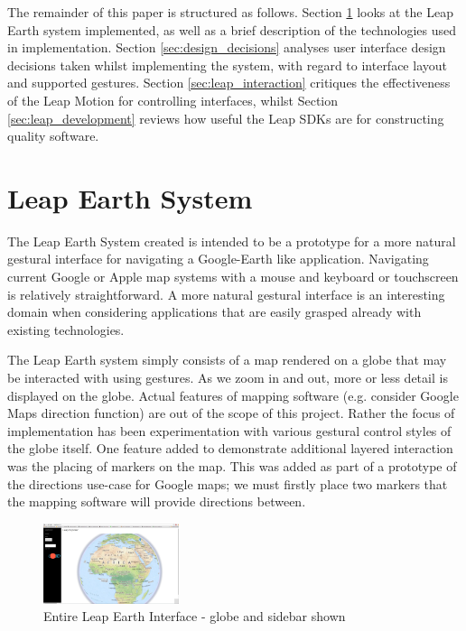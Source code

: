 \documentclass{sigplanconf}
\begin{document}
The remainder of this paper is structured as follows. Section \ref{sec:leap_system} looks at the Leap Earth system implemented, as well as a brief description of the technologies used in implementation. Section \ref{sec:design_decisions} analyses user interface design decisions taken whilst implementing the system, with regard to interface layout and supported gestures. Section \ref{sec:leap_interaction} critiques the effectiveness of the Leap Motion for controlling interfaces, whilst Section \ref{sec:leap_development} reviews how useful the Leap SDKs are for constructing quality software.

\section{Leap Earth System}
\label{sec:leap_system}

The Leap Earth System created is intended to be a prototype for a more natural gestural interface for navigating a Google-Earth like application. Navigating current Google or Apple map systems with a mouse and keyboard or touchscreen is relatively straightforward. A more natural gestural interface is an interesting domain when considering applications that are easily grasped already with existing technologies. 

The Leap Earth system simply consists of a map rendered on a globe that may be interacted with using gestures. As we zoom in and out, more or less detail is displayed on the globe. Actual features of mapping software (e.g. consider Google Maps direction function) are out of the scope of this project. Rather the focus of implementation has been experimentation with various gestural control styles of the globe itself. One feature added to demonstrate additional layered interaction was the placing of markers on the map. This was added as part of a prototype of the directions use-case for Google maps; we must firstly place two markers that the mapping software will provide directions between.


\begin{center}
\begin{figure}[h!]
\centering
\includegraphics[width=150px]{images/entire_interface.png}
\caption{Entire Leap Earth Interface - globe and sidebar shown}
\label{fig:halo_comparison}
\vspace{-10pt}
\end{figure}
\end{center}
\end{document}

